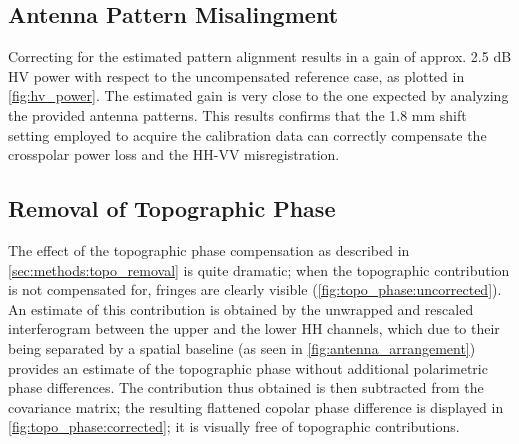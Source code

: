 \subsection{Antenna Pattern Misalingment}\label{sec:discussion:misalignment}
Correcting for the estimated pattern alignment results in a gain of approx. 2.5 dB HV power with respect to the uncompensated reference case, as plotted in \autoref{fig:hv_power}. The estimated gain is very close to the one expected by analyzing the provided antenna patterns. This results confirms that the 1.8 mm shift setting employed to acquire the calibration data can correctly compensate the crosspolar power loss and the HH-VV misregistration.
\subsection{Removal of Topographic Phase}
The effect of the topographic phase compensation as described in \autoref{sec:methods:topo_removal} is quite dramatic;
when the topographic contribution is not compensated for, fringes are clearly visible (\autoref{fig:topo_phase:uncorrected}). An estimate of this contribution is obtained by the unwrapped and rescaled interferogram between the upper and the lower HH channels, which due to their being separated by a spatial baseline (as seen in \autoref{fig:antenna_arrangement}) provides an estimate of the topographic phase without additional polarimetric phase differences. The contribution thus obtained is then subtracted from the covariance matrix; the resulting flattened copolar phase difference is displayed in \autoref{fig:topo_phase:corrected}; it is visually free of topographic contributions.
